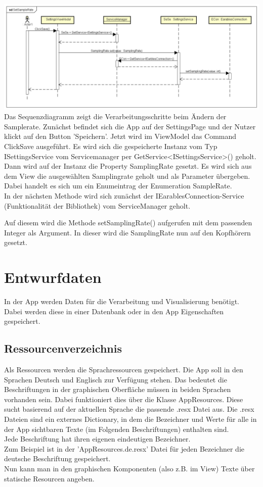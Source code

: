 \documentclass[a4paper,12pt]{article}
\begin{document}
\includegraphics[width=1.1\textwidth]{./Diagramme/SetSampleRateSeqDia.png}\\

Das Sequenzdiagramm zeigt die Verarbeitungsschritte beim Ändern der Samplerate.
Zunächst befindet sich die App auf der SettingsPage und der Nutzer klickt auf den Button 'Speichern'. Jetzt wird im ViewModel das Command ClickSave ausgeführt. Es wird sich die gespeicherte Instanz vom Typ ISettingsService vom Servicemanager per GetService<ISettingsService>() geholt.\\
Dann wird auf der Instanz die Property SamplingRate gesetzt. Es wird sich aus dem View die ausgewählten Samplingrate geholt und als Parameter übergeben. Dabei handelt es sich um ein Enumeintrag der Enumeration SampleRate.\\
In der nächsten Methode wird sich zunächst der IEarablesConnection-Service (Funktionalität der Bibliothek) vom ServiceManager geholt. 

Auf diesem wird die Methode setSamplingRate() aufgerufen mit dem passenden Integer als Argument.
In dieser wird die SamplingRate nun auf den Kopfhörern gesetzt.\\
\newpage
\section{Entwurfdaten}
In der App werden Daten für die Verarbeitung und Visualisierung benötigt. Dabei werden diese in einer Datenbank oder in den App Eigenschaften gespeichert.
\subsection{Ressourcenverzeichnis}

Als Ressourcen werden die Sprachressourcen gespeichert. Die App soll in den Sprachen Deutsch und Englisch zur Verfügung stehen. Das bedeutet die Beschriftungen in der graphischen Oberfläche müssen in beiden Sprachen vorhanden sein. Dabei funktioniert dies über die Klasse AppResources. Diese sucht basierend auf der aktuellen Sprache die passende .resx Datei aus. Die .resx Dateien sind ein externes Dictionary, in dem die Bezeichner und Werte für alle in der App sichtbaren Texte (im Folgenden Beschriftungen) enthalten sind.\\
Jede Beschriftung hat ihren eigenen eindeutigen Bezeichner. \\Zum Beispiel ist in der 'AppResources.de.resx' Datei für jeden Bezeichner die deutsche Beschriftung gespeichert.\\
Nun kann man in den graphischen Komponenten (also z.B. im View) Texte über statische Resourcen angeben.
\end{document}
